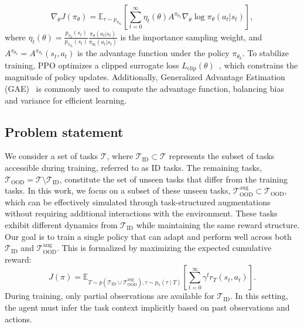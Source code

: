 \begin{equation}
\label{eq:policy_grad_ppo}
\nabla_\theta J(\pi_\theta) = \mathbb{E}_{\tau \sim p_{\pi_{\theta_k}}} \left[ \sum_{t=0}^{\infty} \eta_t(\theta) A^{\pi_{\theta_k}} \nabla_\theta \log \pi_\theta(a_t | s_t) \right],
\end{equation}
where \( \eta_t(\theta) = \frac{p_{\pi_{\theta}}(s_t)}{p_{\pi_{\theta_k}}(s_t)} \frac{\pi_{\theta}(a_t | s_t)}{\pi_{\theta_k}(a_t | s_t)}\) is the importance sampling weight,
and \( A^{\pi_{\theta_k}} = A^{\pi_{\theta_k}}(s_t, a_t)\) is the advantage function under the policy \( \pi_{\theta_k} \).
To stabilize training, PPO optimizes a clipped surrogate loss \(L_{\text{clip}}(\theta)\)~\citep{schulman2017PPO}, which constrains the magnitude of policy updates.
Additionally, Generalized Advantage Estimation (GAE)~\citep{schulman2015GAE} is commonly used to compute the advantage function, balancing bias and variance for efficient learning.


\subsection{Problem statement}
We consider a set of tasks \( \mathcal{T} \), where \( \mathcal{T}_{\text{ID}} \subset \mathcal{T} \) represents the subset of tasks accessible during training, referred to as ID tasks. The remaining tasks, \( \mathcal{T}_{\text{OOD}} = \mathcal{T} \setminus \mathcal{T}_{\text{ID}} \), constitute the set of unseen tasks that differ from the training tasks. 
In this work, we focus on a subset of these unseen tasks, \( \mathcal{T}_{\text{OOD}}^{\text{aug}} \subset \mathcal{T}_{\text{OOD}} \), which can be effectively simulated through task-structured augmentations without requiring additional interactions with the environment.
These tasks exhibit different dynamics from \( \mathcal{T}_{\text{ID}} \) while maintaining the same reward structure. 
Our goal is to train a single policy that can adapt and perform well across both \( \mathcal{T}_{\text{ID}} \) and \( \mathcal{T}_{\text{OOD}}^{\text{aug}} \). 
This is formalized by maximizing the expected cumulative reward:
\[
J(\pi) = \mathbb{E}_{T \sim p(\mathcal{T}_{\text{ID}} \cup \mathcal{T}_{\text{OOD}}^{\text{aug}}), \tau \sim p_\pi(\tau \mid T)} \left[ \sum_{t=0}^\infty \gamma^t r_{T}(s_t, a_t) \right].
\]
During training, only partial observations are available for \( \mathcal{T}_{\text{ID}}\). 
In this setting, the agent must infer the task context implicitly based on past observations and actions.

